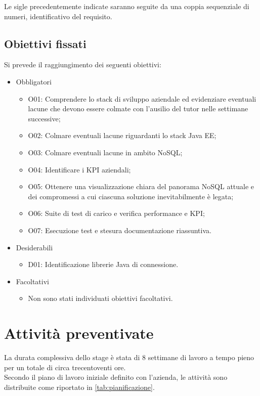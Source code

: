 \noindent Le sigle precedentemente indicate saranno seguite da una coppia sequenziale di numeri, identificativo del requisito.

\subsection{Obiettivi fissati}
Si prevede il raggiungimento dei seguenti obiettivi:
\begin{itemize}
    \item Obbligatori
    \begin{itemize}
        \item O01: Comprendere lo stack di sviluppo aziendale ed evidenziare eventuali lacune che devono essere colmate con l’ausilio del tutor nelle settimane successive;
        \item O02: Colmare eventuali lacune riguardanti lo stack Java EE;
        \item O03: Colmare eventuali lacune in ambito NoSQL;
        \item O04: Identificare i KPI aziendali;
        \item O05: Ottenere una visualizzazione chiara del panorama NoSQL attuale e dei compromessi a cui ciascuna soluzione inevitabilmente è legata;
        \item O06: Suite di test di carico e verifica performance e KPI;
        \item O07: Esecuzione test e stesura documentazione riassuntiva.
    \end{itemize}
    \item Desiderabili
    \begin{itemize}
        \item D01: Identificazione librerie Java di connessione.
    \end{itemize}
    \item Facoltativi
    \begin{itemize}
        \item Non sono stati individuati obiettivi facoltativi.
    \end{itemize}
\end{itemize}

\section{Attività preventivate}

La durata complessiva dello stage è stata di 8 settimane di lavoro a tempo pieno per un totale di circa trecentoventi ore.\\
\noindent Secondo il piano di lavoro iniziale definito con l'azienda, le attività sono distribuite come riportato in \autoref{tab:pianificazione}.\\

